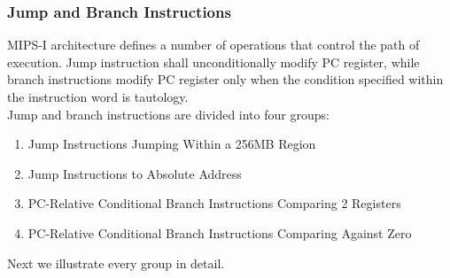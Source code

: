 \documentclass[oneside]{book}
\begin{document}
\subsubsection{Jump and Branch Instructions}

MIPS-I architecture defines a number of operations that control the path
of execution. Jump instruction shall unconditionally modify PC register,
while branch instructions modify PC register only when the condition
specified within the instruction word is tautology.\\

Jump and branch instructions are divided into four groups:

\begin{enumerate}

\item Jump Instructions Jumping Within a 256MB Region
\item Jump Instructions to Absolute Address
\item PC-Relative Conditional Branch Instructions Comparing 2 Registers
\item PC-Relative Conditional Branch Instructions Comparing Against Zero

\end{enumerate}

Next we illustrate every group in detail.
\end{document}
